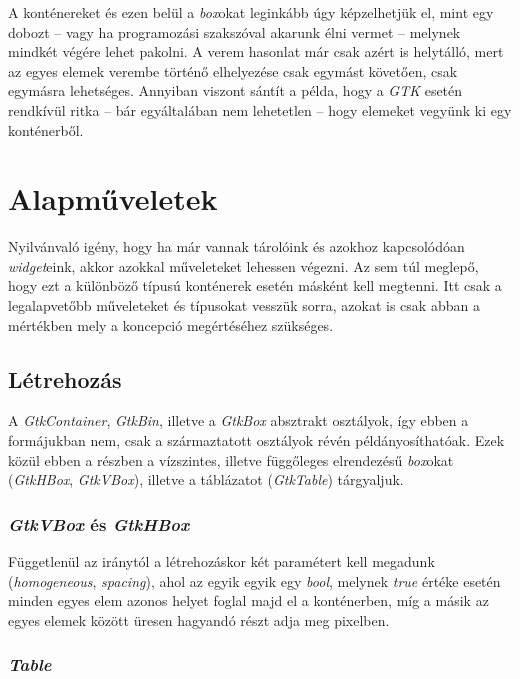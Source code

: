 \documentclass[a4paper,10pt]{article}
\begin{document}
A konténereket és ezen belül a \textit{box}okat leginkább úgy képzelhetjük el, mint egy dobozt -- vagy ha programozási szakszóval akarunk élni vermet -- melynek mindkét végére lehet pakolni. A verem hasonlat már csak azért is helytálló, mert az egyes elemek verembe történő elhelyezése csak egymást követően, csak egymásra lehetséges. Annyiban viszont sántít a példa, hogy a \textit{GTK} esetén rendkívül ritka -- bár egyáltalában nem lehetetlen -- hogy elemeket vegyünk ki egy konténerből.

\section{Alapműveletek}

Nyilvánvaló igény, hogy ha már vannak tárolóink és azokhoz kapcsolódóan \textit{widget}eink, akkor azokkal műveleteket lehessen végezni. Az sem túl meglepő, hogy ezt a különböző típusú konténerek esetén másként kell megtenni. Itt csak a legalapvetőbb műveleteket és típusokat vesszük sorra, azokat is csak abban a mértékben mely a koncepció megértéséhez szükséges.

\subsection{Létrehozás}

A \textit{GtkContainer}, \textit{GtkBin}, illetve a \textit{GtkBox} absztrakt osztályok, így ebben a formájukban nem, csak a származtatott osztályok révén példányosíthatóak. Ezek közül ebben a részben a vízszintes, illetve függőleges elrendezésű \textit{box}okat (\textit{GtkHBox}, \textit{GtkVBox}), illetve a táblázatot (\textit{GtkTable}) tárgyaljuk.

\subsubsection{\textit{GtkVBox} és \textit{GtkHBox}}

Függetlenül az iránytól a létrehozáskor két paramétert kell megadunk (\textit{homogeneous}, \textit{spacing}), ahol az egyik egyik egy \textit{bool}, melynek \textit{true} értéke esetén minden egyes elem azonos helyet foglal majd el a konténerben, míg a másik az egyes elemek között üresen hagyandó részt adja meg pixelben.

\subsubsection{\textit{Table}}
\end{document}
